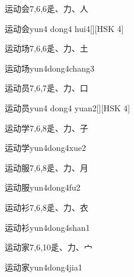 \begin{entry}{运动会}{7,6,6}{⾡、⼒、⼈}
  \begin{phonetics}{运动会}{yun4 dong4 hui4}[][HSK 4]
  \end{phonetics}
\end{entry}

\begin{entry}{运动场}{7,6,6}{⾡、⼒、⼟}
  \begin{phonetics}{运动场}{yun4dong4chang3}
  \end{phonetics}
\end{entry}

\begin{entry}{运动员}{7,6,7}{⾡、⼒、⼝}
  \begin{phonetics}{运动员}{yun4 dong4 yuan2}[][HSK 4]
  \end{phonetics}
\end{entry}

\begin{entry}{运动学}{7,6,8}{⾡、⼒、⼦}
  \begin{phonetics}{运动学}{yun4dong4xue2}
  \end{phonetics}
\end{entry}

\begin{entry}{运动服}{7,6,8}{⾡、⼒、⽉}
  \begin{phonetics}{运动服}{yun4dong4fu2}
  \end{phonetics}
\end{entry}

\begin{entry}{运动衫}{7,6,8}{⾡、⼒、⾐}
  \begin{phonetics}{运动衫}{yun4dong4shan1}
  \end{phonetics}
\end{entry}

\begin{entry}{运动家}{7,6,10}{⾡、⼒、⼧}
  \begin{phonetics}{运动家}{yun4dong4jia1}
  \end{phonetics}
\end{entry}

